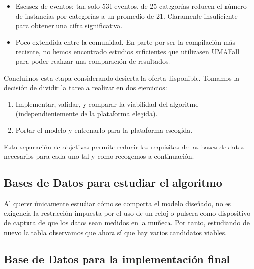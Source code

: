 \begin{itemize}
  \item Escasez de eventos: tan solo 531 eventos, de 25 categorías reducen el número de instancias por categorías a un promedio de 21. Claramente insuficiente para obtener una cifra significativa.
  \item Poco extendida entre la comunidad. En parte por ser la compilación más reciente, no hemos encontrado estudios suficientes que utilizasen UMAFall para poder realizar una comparación de resultados.
\end{itemize}
Concluimos esta etapa considerando desierta la oferta disponible. Tomamos la decisión de dividir la tarea a realizar en dos ejercicios:
\begin{enumerate}
  \item Implementar, validar, y comparar la viabilidad del algoritmo (independientemente de la plataforma elegida).
  \item Portar el modelo y entrenarlo para la plataforma escogida.
\end{enumerate}

Esta separación de objetivos permite reducir los requisitos de las bases de datos necesarios para cada uno tal y como recogemos a continuación.


\subsection{Bases de Datos para estudiar el algoritmo}

Al querer únicamente estudiar cómo se comporta el modelo diseñado, no es exigencia la restricción impuesta por el uso de un reloj o pulsera como dispositivo de captura de que los datos sean medidos en la muñeca. Por tanto, estudiando de nuevo la tabla  observamos que ahora sí que hay varios candidatos viables.


\subsection{Base de Datos para la implementación final}


